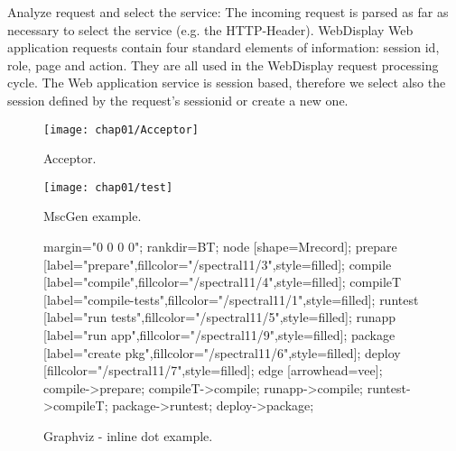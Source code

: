 Analyze request and select the service:
The incoming request is parsed as far as necessary to select the service (e.g.
the HTTP-Header). WebDisplay Web application requests contain four standard
elements of information: session id, role, page and action. They are all used in
the WebDisplay request processing cycle. The Web application service is session
based, therefore we select also the session defined by the request’s sessionid
or create a new one.

\begin{figure}[hbt]
  \centering
  \texttt{[image: chap01/Acceptor]}
  \caption{Acceptor.}
  \label{fig:acceptor}
\end{figure}

\begin{figure}[hbt]
  \centering
  \texttt{[image: chap01/test]}
  \caption{MscGen example.}
  \label{fig:mscgen_example}
\end{figure}

\begin{figure}[hbt]
  \centering
    {
      margin="0 0 0 0";
      rankdir=BT;
      node [shape=Mrecord];
      prepare [label="prepare",fillcolor="/spectral11/3",style=filled];
      compile [label="compile",fillcolor="/spectral11/4",style=filled];
      compileT [label="compile-tests",fillcolor="/spectral11/1",style=filled];
      runtest [label="run tests",fillcolor="/spectral11/5",style=filled];
      runapp [label="run app",fillcolor="/spectral11/9",style=filled];
      package [label="create pkg",fillcolor="/spectral11/6",style=filled];
      deploy [fillcolor="/spectral11/7",style=filled];
      edge [arrowhead=vee];
      compile->prepare;
      compileT->compile;
      runapp->compile;
      runtest->compileT;
      package->runtest;
      deploy->package;
    }
  \caption{Graphviz - inline dot example.}
  \label{fig:graphviz_inline_sample}
\end{figure}

